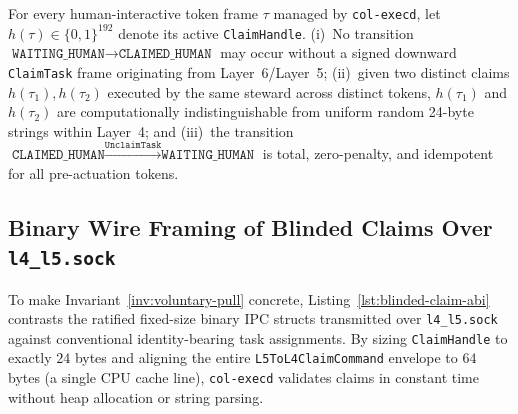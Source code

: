 \begin{invariant}
\label{inv:voluntary-pull}
For every human-interactive token frame $\tau$ managed by \texttt{col-execd}, let $h(\tau) \in \{0,1\}^{192}$ denote its active \texttt{ClaimHandle}. (i)~No transition $\texttt{WAITING\_HUMAN} \to \texttt{CLAIMED\_HUMAN}$ may occur without a signed downward \texttt{ClaimTask} frame originating from Layer~6/Layer~5; (ii)~given two distinct claims $h(\tau_1), h(\tau_2)$ executed by the same steward across distinct tokens, $h(\tau_1)$ and $h(\tau_2)$ are computationally indistinguishable from uniform random 24-byte strings within Layer~4; and (iii)~the transition $\texttt{CLAIMED\_HUMAN} \xrightarrow{\texttt{UnclaimTask}} \texttt{WAITING\_HUMAN}$ is total, zero-penalty, and idempotent for all pre-actuation tokens.
\end{invariant}

\subsection{Binary Wire Framing of Blinded Claims Over \texttt{l4\_l5.sock}}

To make Invariant~\ref{inv:voluntary-pull} concrete, Listing~\ref{lst:blinded-claim-abi} contrasts the ratified fixed-size binary IPC structs transmitted over \texttt{l4\_l5.sock} against conventional identity-bearing task assignments. By sizing \texttt{ClaimHandle} to exactly $24$ bytes and aligning the entire \texttt{L5ToL4ClaimCommand} envelope to $64$ bytes (a single CPU cache line), \texttt{col-execd} validates claims in constant time without heap allocation or string parsing.

